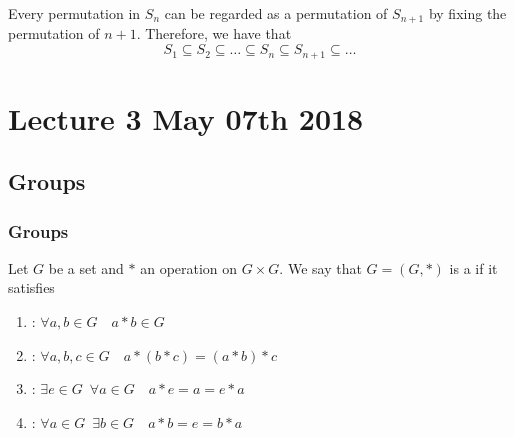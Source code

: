 \documentclass[notoc,notitlepage]{tufte-book}
\begin{document}
\begin{note}[Convention]
 Every permutation in $S_n$ can be regarded as a permutation of $S_{n + 1}$ by fixing the permutation of $n + 1$. Therefore, we have that
 \begin{equation*}
   S_1 \subseteq S_2 \subseteq \hdots \subseteq S_n \subseteq S_{n + 1} \subseteq \hdots
 \end{equation*}
\end{note}




\chapter{Lecture 3 May 07th 2018}
  \label{chapter:lecture_3_may_07th_2018}

\section{Groups} %
\label{sec:groups}

\subsection{Groups} %
\label{sub:groups}

\begin{defn}\label{defn:groups}
  Let $G$ be a set and $*$ an operation on $G \times G$. We say that $G = (G, *)$ is a  if it satisfies
  \begin{enumerate}
    \item {}: $\forall a, b \in G \quad a * b \in G$
    \item {}: $\forall a, b, c \in G \quad a * (b * c) = (a * b) * c$
    \item {}: $\exists e \in G \enspace \forall a \in G \quad a * e = a = e * a$
    \item {}: $\forall a \in G \enspace \exists b \in G \quad a * b = e = b * a$
  \end{enumerate}
\end{defn}
\end{document}
